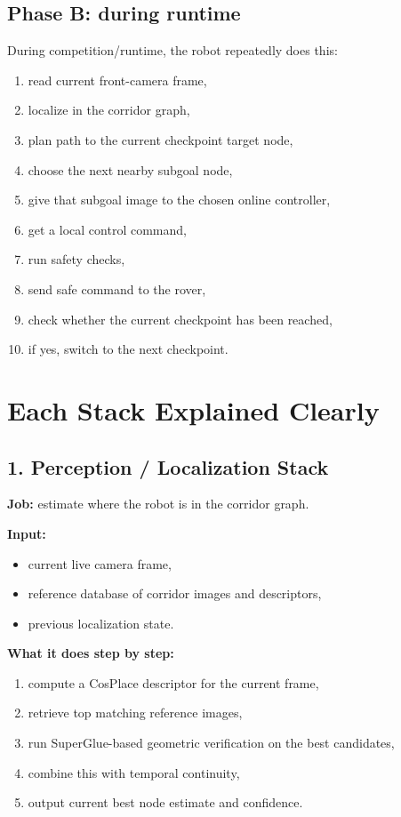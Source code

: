 \documentclass[11pt,a4paper]{article}
\begin{document}
\subsection{Phase B: during runtime}

During competition/runtime, the robot repeatedly does this:

\begin{enumerate}[nosep]
  \item read current front-camera frame,
  \item localize in the corridor graph,
  \item plan path to the current checkpoint target node,
  \item choose the next nearby subgoal node,
  \item give that subgoal image to the chosen online controller,
  \item get a local control command,
  \item run safety checks,
  \item send safe command to the rover,
  \item check whether the current checkpoint has been reached,
  \item if yes, switch to the next checkpoint.
\end{enumerate}


\section{Each Stack Explained Clearly}

\subsection{1. Perception / Localization Stack}

\textbf{Job:} estimate where the robot is in the corridor graph.

\textbf{Input:}

\begin{itemize}[nosep]
  \item current live camera frame,
  \item reference database of corridor images and descriptors,
  \item previous localization state.
\end{itemize}

\textbf{What it does step by step:}

\begin{enumerate}[nosep]
  \item compute a CosPlace descriptor for the current frame,
  \item retrieve top matching reference images,
  \item run SuperGlue-based geometric verification on the best candidates,
  \item combine this with temporal continuity,
  \item output current best node estimate and confidence.
\end{enumerate}
\end{document}
